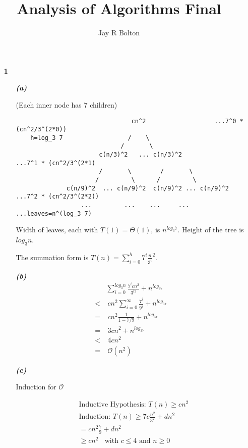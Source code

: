\documentclass{article}
\title{Analysis of Algorithms Final}
\author{Jay R Bolton}
\begin{document}
\maketitle

\begin{enumerate}

\item[\textbf{1}]

	\begin{enumerate}
		\item[\textbf{\emph{(a)}}]

		(Each inner node has 7 children)

    \begin{verbatim}
                                cn^2                   ...7^0 * (cn^2/3^(2*0))
    h=log_3 7                  /    \
                             /       \
                       c(n/3)^2   ... c(n/3)^2             ...7^1 * (cn^2/3^(2*1)
                       /       \        /       \
                      /         \      /         \
              c(n/9)^2  ... c(n/9)^2  c(n/9)^2 ... c(n/9)^2     ...7^2 * (cn^2/3^(2*2))
                  ...         ...    ...     ...       ...leaves=n^(log_3 7)
		\end{verbatim}

		Width of leaves, each with $T(1) = \Theta(1)$, is $n^{log_{3}7}$. Height
		of the tree is $log_3 n$.

		The summation form is $T(n) = \sum_{i=0}^{h} 7^i \frac{n}{3^i}^2$.

		\item[\textbf{\emph{(b)}}]
			\begin{align*}
				& \sum_{i=0}^{log_3n} \frac{7^icn^2}{3^{i2}} + n^{log_37} \\
				<&\ cn^2 \sum_{i=0}^{\infty} \frac{7^i}{9^{i}} + n^{log_37} \\
				=&\ cn^2 \frac{1}{1 - 7/9} + n^{log_37} \\
				=&\ 3cn^2 + n^{log_37} \\
				<&\ 4cn^2 \\
				=&\ \mathcal{O}(n^2)
			\end{align*}

		\item[\textbf{\emph{(c)}}]

			Induction for $\mathcal{O}$

			\begin{align*}
			& \text{Inductive Hypothesis: } T(n) \geq cn^2\\
			& \text{Induction: } T(n) \geq 7c\frac{n^2}{3^2} + dn^2 \\
			& = cn^2 \frac{7}{9} + dn^2 \\
			& \geq cn^2 \ \ \ \ \text{with $c \leq 4$ and $n \geq 0$}
			\end{align*}


\end{enumerate}
\end{enumerate}
\end{document}
